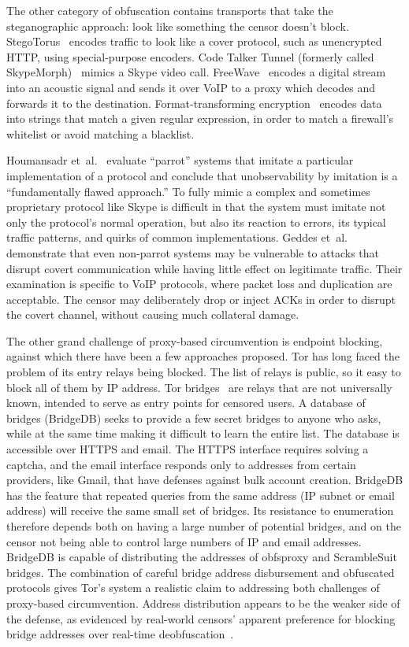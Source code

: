 \documentclass{article}
\begin{document}
The other category of obfuscation contains transports that take the steganographic approach: look like
something the censor doesn't block. StegoTorus~\cite{stegotorus}
encodes traffic to look like a cover protocol, such as unencrypted HTTP,
using special-purpose encoders.
Code Talker
Tunnel (formerly called SkypeMorph)~\cite{skypemorph} mimics a Skype video call.
FreeWave~\cite{freewave} encodes a digital stream into an acoustic signal
and sends it over VoIP to a proxy which decodes and forwards it to the destination.
Format-transforming encryption~\cite{fte} encodes data into strings that match a given regular expression,
in order to match a firewall's whitelist or avoid matching a blacklist.

Houmansadr et~al.~\cite{parrot} evaluate ``parrot'' systems that imitate a particular implementation of a protocol
and conclude that unobservability by imitation is a ``fundamentally
flawed approach.''
To fully mimic a complex and sometimes proprietary protocol like Skype
is difficult in that the system must imitate not only the protocol's normal operation, but also its reaction to errors,
its typical traffic patterns, and quirks of common implementations.
Geddes et~al.~\cite{acks}
demonstrate that even non-parrot systems may be vulnerable to
attacks that disrupt covert communication while having little effect
on legitimate traffic. Their examination is specific to VoIP protocols,
where packet loss and duplication are acceptable. The censor may
deliberately drop or inject ACKs in order to disrupt the covert channel, without causing
much collateral damage.


The other grand challenge of proxy-based circumvention is endpoint blocking,
against which there have been a few approaches proposed.
Tor has long faced the problem of its entry relays being blocked. The list of
relays is public, so it easy to block all of them by IP address. Tor
bridges~\cite{tor-blocking} are relays that are not universally known, intended
to serve as entry points for censored users. A database of bridges (BridgeDB) seeks to
provide a few secret bridges to anyone who asks, while at the same time making it
difficult to learn the entire list.
The database is accessible over HTTPS and email.
The HTTPS interface requires solving a captcha,
and the email interface responds only to addresses from certain providers, like Gmail,
that have defenses against bulk account creation.
BridgeDB has the feature that repeated queries from the same address
(IP subnet or email address) will receive the same small set of bridges.
Its resistance to enumeration therefore depends both on
having a large number of potential bridges,
and on the censor not being able to control large numbers of IP and email addresses.
BridgeDB is capable of distributing
the addresses of obfsproxy and ScrambleSuit bridges.
The combination
of careful bridge address disbursement and obfuscated protocols
gives Tor's system a realistic claim to addressing both challenges of proxy-based circumvention.
Address distribution appears to be the weaker side of the defense,
as evidenced by real-world censors' apparent preference for
blocking bridge addresses over real-time deobfuscation~\cite{foci12-winter}.
\end{document}
